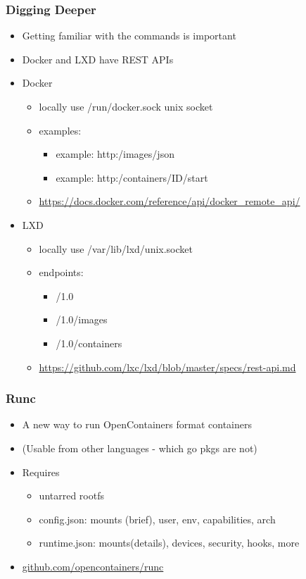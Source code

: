 \documentclass{beamer}
\begin{document}
\begin{frame}
\frametitle{Digging Deeper}
\begin{itemize}
  \item Getting familiar with the commands is important
  \item Docker and LXD have REST APIs
  \item Docker

    \begin{itemize}
      \item locally use /run/docker.sock unix socket
      \item examples:
        \begin{itemize}
          \item example: http:/images/json
          \item example: http:/containers/ID/start
        \end{itemize}
      \item \url{https://docs.docker.com/reference/api/docker_remote_api/}
    \end{itemize}

  \item LXD

    \begin{itemize}
      \item locally use /var/lib/lxd/unix.socket
      \item endpoints:
        \begin{itemize}
          \item /1.0
          \item /1.0/images
          \item /1.0/containers
        \end{itemize}
        \item \url{https://github.com/lxc/lxd/blob/master/specs/rest-api.md}
    \end{itemize}

\end{itemize}
\end{frame}

\begin{frame}
\frametitle{Runc}
\begin{itemize}
\item A new way to run OpenContainers format containers
\item (Usable from other languages - which go pkgs are not)
\item Requires
  \begin{itemize}
  \item untarred rootfs
  \item config.json: mounts (brief), user, env, capabilities, arch
  \item runtime.json: mounts(details), devices, security, hooks, more
  \end{itemize}
\item \url{github.com/opencontainers/runc}
\end{itemize}
\end{frame}
\end{document}
